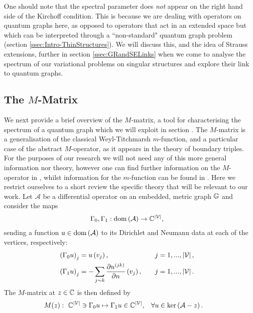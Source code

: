 One should note that the spectral parameter does \emph{not} appear on the right hand side of the Kirchoff condition.
This is because we are dealing with operators on quantum graphs here, as opposed to operators that act in an extended space but which can be interpreted through a ``non-standard" quantum graph problem (section \ref{ssec:Intro-ThinStructures}).
We will discuss this, and the idea of Strauss extensions, further in section \ref{ssec:GRandSELinks} when we come to analyse the spectrum of our variational problems on singular structures and explore their link to quantum graphs.

\subsection{The $M$-Matrix} \label{ssec:MMatrix}
We next provide a brief overview of the $M$-matrix, a tool for characterising the spectrum of a quantum graph which we will exploit in section .
The $M$-matrix is a generalisation of the classical Weyl-Titchmarsh $m$-function, and a particular case of the abstract $M$-operator, as it appears in the theory of boundary triples.
For the purposes of our research we will not need any of this more general information nor theory, however one can find further information on the $M$-operator in \cite{kochubei1975extensions, kochubei1980characteristic, gorbachuk1991boundary, brown2008boundary, brown2020functional, cherednichenko2020scattering, cherednichenko2018functional}, whilst information for the $m$-function can be found in \cite{titchmarsh1962eigenfunction, atkinson1964discrete}.
Here we restrict ourselves to a short review the specific theory that will be relevant to our work.
Let $\mathcal{A}$ be a differential operator on an embedded, metric graph $\mathbb{G}$ and consider the maps
\begin{align*}
	\Gamma_0, \Gamma_1: \mathrm{dom}\left( \mathcal{A} \right) \rightarrow \mathbb{C}^{\left\lvert \mathcal{V} \right\rvert},
\end{align*}
sending a function $u\in\mathrm{dom}\left( \mathcal{A} \right)$ to its Dirichlet and Neumann data at each of the vertices, respectively:
\begin{align*}
	\left( \Gamma_0 u \right)_j &= u\left( v_j \right), \quad &j=1,...,\left\lvert \mathcal{V} \right\rvert, \\
	\left( \Gamma_1 u \right)_j &= -\sum_{j\sim k}\dfrac{\partial u^{(jk)}}{\partial n}\left( v_j \right), \quad &j=1,...,\left\lvert \mathcal{V} \right\rvert. 
\end{align*}
The $M$-matrix at $z\in\mathbb{C}$ is then defined by
\begin{align*}
	M(z): \ \mathbb{C}^{\left\lvert \mathcal{V} \right\rvert} \ni \Gamma_0 u \mapsto \Gamma_1 u \in \mathbb{C}^{\left\lvert \mathcal{V} \right\rvert},
	 &\quad \forall u\in\mathrm{ker}\left( \mathcal{A}-z \right).
\end{align*}
